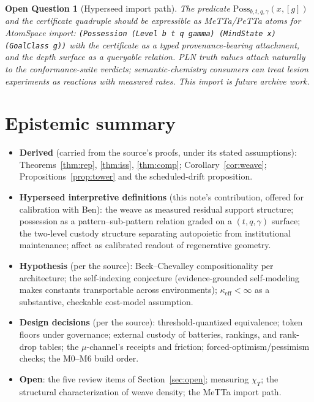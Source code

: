 \documentclass[11pt]{article}
\newtheorem{openquestion}{Open Question}
\newcommand{\Poss}{\mathrm{Poss}}
\begin{document}
\begin{openquestion}[Hyperseed import path]
The predicate $\Poss_{b,t,q,\gamma}(x,[g])$ and the certificate quadruple should be
expressible as MeTTa/PeTTa atoms for AtomSpace import: \texttt{(Possession (Level b t q
gamma) (MindState x) (GoalClass g))} with the certificate as a typed provenance-bearing
attachment, and the depth surface as a queryable relation. PLN truth values attach
naturally to the conformance-suite verdicts; semantic-chemistry consumers can treat
lesion experiments as reactions with measured rates. This import is future archive work.
\end{openquestion}

\section{Epistemic summary}

\begin{itemize}
\item \textbf{Derived} (carried from the source's proofs, under its stated assumptions):
Theorems~\ref{thm:rep}, \ref{thm:iss}, \ref{thm:comp}; Corollary~\ref{cor:weave};
Propositions~\ref{prop:tower} and the scheduled-drift proposition.
\item \textbf{Hyperseed interpretive definitions} (this note's contribution, offered for
calibration with Ben): the weave as measured residual support structure; possession as a
pattern--sub-pattern relation graded on a $(t,q,\gamma)$ surface; the two-level custody
structure separating autopoietic from institutional maintenance; affect as calibrated
readout of regenerative geometry.
\item \textbf{Hypothesis} (per the source): Beck--Chevalley compositionality per
architecture; the self-indexing conjecture (evidence-grounded self-modeling makes
constants transportable across environments); $\kappa_{\mathrm{eff}} < \infty$ as a
substantive, checkable cost-model assumption.
\item \textbf{Design decisions} (per the source): threshold-quantized equivalence;
token floors under governance; external custody of batteries, rankings, and rank-drop
tables; the $\mu$-channel's receipts and friction; forced-optimism/pessimism checks;
the M0--M6 build order.
\item \textbf{Open}: the five review items of Section~\ref{sec:open}; measuring
$\chi_T$; the structural characterization of weave density; the MeTTa import path.
\end{itemize}
\end{document}
